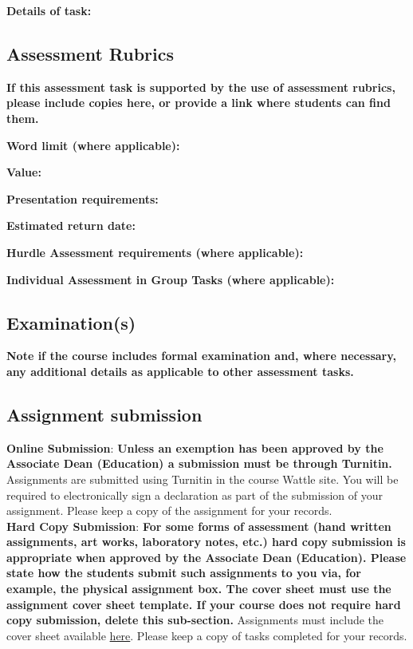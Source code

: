 \documentclass[11pt]{article}
\begin{document}
\textbf{Details of task:}

\subsection*{Assessment Rubrics}
{\bfseries\color{red}If this assessment task is supported by the use of assessment rubrics, please include copies here, or provide a link where students can find them.}

\textbf{Word limit (where applicable):}

\textbf{Value:}

\textbf{Presentation requirements:}

\textbf{Estimated return date:}

\textbf{Hurdle Assessment requirements (where applicable):}

\textbf{Individual Assessment in Group Tasks (where applicable):}

\subsection*{Examination(s)}
{\bfseries\color{red}Note if the course includes formal examination and, where necessary, any additional details as applicable to other assessment tasks.}

\subsection*{Assignment submission}
\textbf{Online Submission}: {\bfseries\color{red}Unless an exemption has been approved by the Associate Dean (Education) a submission must be through Turnitin.} Assignments are submitted using Turnitin in the course Wattle site. You will be required to electronically sign a declaration as part of the submission of your assignment. Please keep a copy of the assignment for your records. \\

\textbf{Hard Copy Submission}: {\bfseries\color{red}For some forms of assessment (hand written assignments, art works, laboratory notes, etc.) hard copy submission is appropriate when approved by the Associate Dean (Education). Please state how the students submit such assignments to you via, for example, the physical assignment box. The cover sheet must use the assignment cover sheet template. If your course does not require hard copy submission, delete this sub-section.} Assignments must include the cover sheet available \underline{\color{blue} here}. Please keep a copy of tasks completed for your records.
\end{document}
